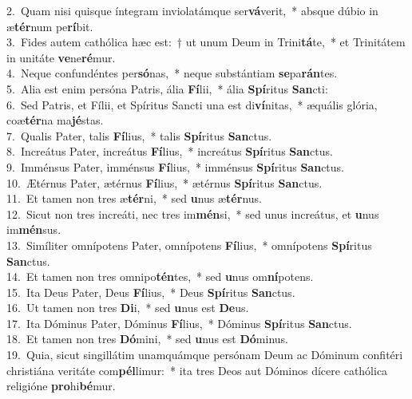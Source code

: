 {2.~}Quam nisi quisque íntegram inviolatámque ser\textbf{vá}verit,~* absque dúbio in æ\textbf{tér}num pe\textbf{rí}bit.\\
{3.~}Fides autem cathólica hæc est:~† ut unum Deum in Trini\textbf{tá}te,~* et Trinitátem in unitáte \textbf{ve}ne\textbf{ré}mur.\\
{4.~}Neque confundéntes per\textbf{só}nas,~* neque substántiam \textbf{se}pa\textbf{rán}tes.\\
{5.~}Alia est enim persóna Patris, ália \textbf{Fí}lii,~* ália \textbf{Spí}ritus \textbf{San}cti:\\
{6.~}Sed Patris, et Fílii, et Spíritus Sancti una est di\textbf{ví}nitas,~* æquális glória, coæ\textbf{tér}na ma\textbf{jé}stas.\\
{7.~}Qualis Pater, talis \textbf{Fí}lius,~* talis \textbf{Spí}ritus \textbf{San}ctus.\\
{8.~}Increátus Pater, increátus \textbf{Fí}lius,~* increátus \textbf{Spí}ritus \textbf{San}ctus.\\
{9.~}Imménsus Pater, imménsus \textbf{Fí}lius,~* imménsus \textbf{Spí}ritus \textbf{San}ctus.\\
{10.~}Ætérnus Pater, ætérnus \textbf{Fí}lius,~* ætérnus \textbf{Spí}ritus \textbf{San}ctus.\\
{11.~}Et tamen non tres æ\textbf{tér}ni,~* sed \textbf{u}nus æ\textbf{tér}nus.\\
{12.~}Sicut non tres increáti, nec tres im\textbf{mén}si,~* sed unus increátus, et \textbf{u}nus im\textbf{mén}sus.\\
{13.~}Simíliter omnípotens Pater, omnípotens \textbf{Fí}lius,~* omnípotens \textbf{Spí}ritus \textbf{San}ctus.\\
{14.~}Et tamen non tres omnipo\textbf{tén}tes,~* sed \textbf{u}nus om\textbf{ní}potens.\\
{15.~}Ita Deus Pater, Deus \textbf{Fí}lius,~* Deus \textbf{Spí}ritus \textbf{San}ctus.\\
{16.~}Ut tamen non tres \textbf{Di}i,~* sed \textbf{u}nus est \textbf{De}us.\\
{17.~}Ita Dóminus Pater, Dóminus \textbf{Fí}lius,~* Dóminus \textbf{Spí}ritus \textbf{San}ctus.\\
{18.~}Et tamen non tres \textbf{Dó}mini,~* sed \textbf{u}nus est \textbf{Dó}minus.\\
{19.~}Quia, sicut singillátim unamquámque persónam Deum ac Dóminum confitéri christiána veritáte com\textbf{pél}limur:~* ita tres Deos aut Dóminos dícere cathólica religióne \textbf{pro}hi\textbf{bé}mur.\\

